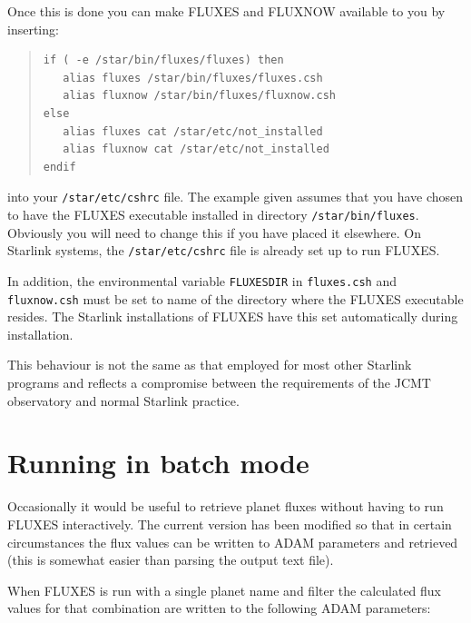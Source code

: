 \documentclass[11pt,twoside]{article}
\newenvironment{myquote}{\begin{quote}\begin{small}}{\end{small}\end{quote}}
\newcommand{\xlabel}[1]{}
\renewcommand{\_}{\texttt{\symbol{95}}}
\begin{document}
Once this is done you can make FLUXES and FLUXNOW available to you
by inserting:

\begin{myquote}
\begin{verbatim}
if ( -e /star/bin/fluxes/fluxes) then
   alias fluxes /star/bin/fluxes/fluxes.csh
   alias fluxnow /star/bin/fluxes/fluxnow.csh
else
   alias fluxes cat /star/etc/not_installed
   alias fluxnow cat /star/etc/not_installed
endif
\end{verbatim}
\end{myquote}

into your {\tt{/star/etc/cshrc}} file.  The example given assumes that
you have chosen to have the FLUXES executable installed in directory
{\tt{/star/bin/fluxes}}.  Obviously you will need to change this if you
have placed it elsewhere.   On Starlink systems, the
{\tt{/star/etc/cshrc}} file is already set up to run FLUXES.

In addition, the environmental variable {\tt{FLUXES\_DIR}} in {\tt{fluxes.csh}}
and {\tt{fluxnow.csh}} must be set to name of the directory where the FLUXES
executable resides.  The Starlink installations of FLUXES have this set
automatically during installation.

This behaviour is not the same as that employed for most other Starlink
programs and reflects a compromise between the requirements of the JCMT
observatory and normal Starlink practice.


\section{Running in batch mode}
\xlabel{batch_mode}
\label{sec:batchmode}

Occasionally it would be useful to retrieve planet fluxes without having
to run FLUXES interactively. The current version has been modified so that
in certain circumstances the flux values can be written to ADAM parameters
and retrieved (this is somewhat easier than parsing the output text file).

When FLUXES is run with a single planet name and filter the calculated
flux values for that combination are written to the following
ADAM parameters:
\end{document}
